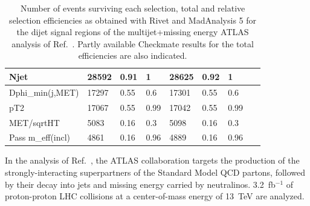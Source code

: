 \documentclass[11pt]{cernrep}
\begin{document}
\begin{table}
\begin{tabular}{ | l || l | l | l || l | l | l || l | }
Njet              & 28592 & 0.91 & 1 & 28625 & 0.92 & 1 & \   \\ \hline
Dphi\_min(j,MET)   & 17297 & 0.55 & 0.6 & 17301 & 0.55 & 0.6 & \   \\ \hline
pT2               & 17067 & 0.55 & 0.99 & 17042 & 0.55 & 0.99 & \   \\ \hline
MET/sqrtHT        & 5083 & 0.16 & 0.3 & 5098 & 0.16 & 0.3 & \   \\ \hline
Pass m\_eff(incl)  & 4861 & 0.16 & 0.96 & 4889 & 0.16 & 0.96 & \   \\ \hline
		\end{tabular}
 \caption{Number of events surviving each selection, total and relative
  selection efficiencies as obtained with Rivet and MadAnalysis 5 for the dijet
  signal regions of the multijet+missing energy ATLAS analysis of
  Ref.~\cite{Aaboud:2016zdn}. Partly available Checkmate results for the total
  efficiencies are also indicated.}
	\label{tab:1605.03814-2j}
\end{table}

In the analysis of Ref.~\cite{Aaboud:2016zdn}, the ATLAS collaboration targets
the production of the strongly-interacting superpartners of the Standard Model
QCD partons, followed by their decay into jets and missing energy carried by
neutralinos. 3.2~fb$^{-1}$ of proton-proton LHC collisions at a center-of-mass
energy of 13~TeV are analyzed.
\end{document}
